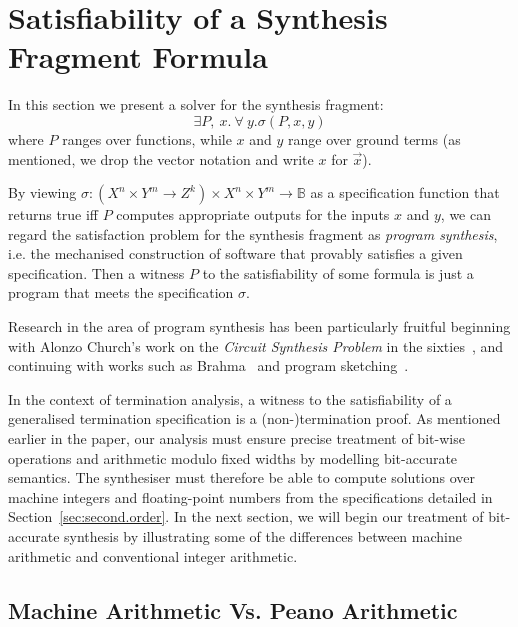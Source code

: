 \documentclass[preprint]{sigplanconf}
\theoremstyle{definition}
\begin{document}


\section{Satisfiability of a Synthesis Fragment Formula} \label{sec:synthesis}

In this section we present a solver for the synthesis fragment:
\[
  \exists P,~ x . ~\forall~ y . \sigma(P, x, y)
\]
%
where $P$ ranges over functions, while $x$ and $y$ range over ground terms (as
mentioned, we drop the vector notation and write $x$ for $\vec{x}$).

By viewing $\sigma: (X^n \times Y^m \to Z^k) \times X^n \times Y^m  \to
\mathbb{B}$ as a specification function that returns true iff $P$ computes
appropriate outputs for the inputs $x$ and $y$, we can regard the
satisfaction problem for the synthesis fragment as \emph{program synthesis},
i.e.  the mechanised construction of software that provably satisfies a
given specification.  Then a witness $P$ to the satisfiability of some formula
is just a program that meets the specification $\sigma$.

Research in the area of program synthesis has been
particularly fruitful beginning with Alonzo Church's work on the
\emph{Circuit Synthesis Problem} in the sixties~\cite{church-synth}, and
continuing with works such as {\sc Brahma}~\cite{brahma} and program
sketching~\cite{lezama-thesis,sketch,modular-sketch}.

In the context of termination analysis, a witness to the
satisfiability of a generalised termination specification is a
\mbox{(non-)termination} proof.  As mentioned earlier in the paper, our
analysis must ensure precise treatment of bit-wise operations and arithmetic
modulo fixed widths by modelling bit-accurate semantics.  The synthesiser
must therefore be able to compute solutions over machine
integers and floating-point numbers from the specifications detailed in
Section~\ref{sec:second.order}.  In the next section, we will begin our treatment of
bit-accurate synthesis by illustrating some of the differences between
machine arithmetic and conventional integer arithmetic.


\subsection{Machine Arithmetic Vs. Peano Arithmetic} \label{sec:machine.arith} 
\end{document}
